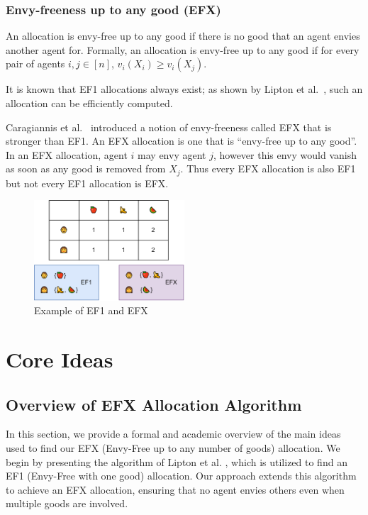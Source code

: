 \documentclass{article}
\begin{document}
\subsubsection*{Envy-freeness up to any good (EFX)}

An allocation is envy-free up to any good if there is no good that an agent envies another agent for. Formally, an allocation is envy-free up to any good if for every pair of agents $i, j \in [n]$, $v_i(X_i) \geq v_i(X_j)$.

 It is known that EF1 allocations always exist; as shown by Lipton et al.~\cite{10.1145/988772.988792}, such an allocation can be efficiently computed.

Caragiannis et al.~\cite{10.1145/3355902} introduced a notion of envy-freeness called EFX that is stronger than EF1. An EFX allocation is one that is “envy-free up to any good”. In an EFX allocation, agent $i$ may envy agent $j$, however this envy would vanish as soon as any good is removed from $X_j$. Thus every EFX allocation is also EF1 but not every EF1 allocation is EFX.

\begin{figure}[htbp]
    \centering
    \includegraphics[width=0.5\textwidth]{image/EFX.png}
    \caption{Example of EF1 and EFX}
    \label{fig:example}
\end{figure}


\section{Core Ideas} \label{sec:core}

\subsection{Overview of EFX Allocation Algorithm}

In this section, we provide a formal and academic overview of the main ideas used to find our EFX (Envy-Free up to any number of goods) allocation. We begin by presenting the algorithm of Lipton et al. \cite{10.1145/988772.988792}, which is utilized to find an EF1 (Envy-Free with one good) allocation. Our approach extends this algorithm to achieve an EFX allocation, ensuring that no agent envies others even when multiple goods are involved.
\end{document}

